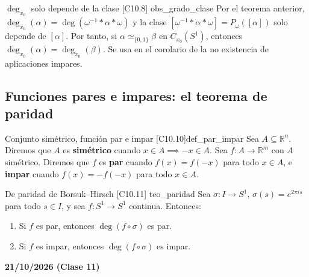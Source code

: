 \begin{observacion}{$\deg_{x_0}$ solo depende de la clase [C10.8] \marcaE}{obs_grado_clase}
Por el teorema anterior, $\deg_{x_0}(\alpha) = \deg(\omega^{-1} * \alpha * \omega)$ y la clase $[\omega^{-1} * \alpha * \omega] = P_\omega([\alpha])$ solo depende de $[\alpha]$. Por tanto, si $\alpha \simeq_{\{0,1\}} \beta$ en $C_{x_0}(S^1)$, entonces $\deg_{x_0}(\alpha) = \deg_{x_0}(\beta)$. Se usa en el corolario de la no existencia de aplicaciones impares.
\end{observacion}

\subsection{Funciones pares e impares: el teorema de paridad}

\begin{definicion}{Conjunto simétrico, función par e impar [C10.10]}{def_par_impar}
Sea $A \subseteq \mathbb{R}^n$. Diremos que $A$ es \textbf{simétrico} cuando $x \in A \implies -x \in A$. Sea $f \colon A \to \mathbb{R}^m$ con $A$ simétrico. Diremos que $f$ es \textbf{par} cuando $f(x) = f(-x)$ para todo $x \in A$, e \textbf{impar} cuando $f(x) = -f(-x)$ para todo $x \in A$.
\end{definicion}

\begin{teorema}{De paridad de Borsuk--Hirsch [C10.11] \marcaT}{teo_paridad}
Sea $\sigma \colon I \to S^1$, $\sigma(s) = e^{2\pi i s}$ para todo $s \in I$, y sea $f \colon S^1 \to S^1$ continua. Entonces:
\begin{enumerate}
    \item[a)] Si $f$ es par, entonces $\deg(f \circ \sigma)$ es par.
    \item[b)] Si $f$ es impar, entonces $\deg(f \circ \sigma)$ es impar.
\end{enumerate}
\end{teorema}

\textbf{21/10/2026 (Clase 11)}

